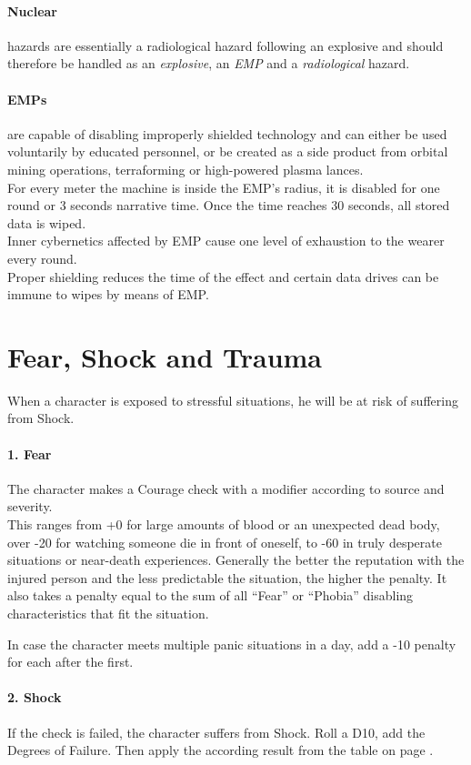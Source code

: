 \documentclass[11pt,a4paper,openany,dvipsnames]{book}
\begin{document}
	\paragraph{Nuclear} hazards are essentially a radiological hazard following an explosive and should therefore be handled as an \emph{explosive}, an \emph{EMP} and a \emph{radiological} hazard.
	\paragraph{EMPs} are capable of disabling improperly shielded technology and can either be used voluntarily by educated personnel, or be created as a side product from orbital mining operations, terraforming or high-powered plasma lances.\\
	For every meter the machine is inside the EMP’s radius, it is disabled for one round or 3 seconds narrative time. Once the time reaches 30 seconds, all stored data is wiped.\\
	Inner cybernetics affected by EMP cause one level of exhaustion to the wearer every round.\\
	Proper shielding reduces the time of the effect and certain data drives can be immune to wipes by means of EMP.
%
	\section{Fear, Shock and Trauma}
	\label{sec:fear}
	When a character is exposed to stressful situations, he will be at risk of suffering from Shock.
	\\%
	\paragraph{1. Fear}
	The character makes a Courage check with a modifier according to source and severity.\\
	This ranges from +0 for large amounts of blood or an unexpected dead body, over -20 for watching someone die in front of oneself, to -60 in truly desperate situations or near-death experiences.
	Generally the better the reputation with the injured person and the less predictable the situation, the higher the penalty. It also takes a penalty equal to the sum of all “Fear” or “Phobia” disabling characteristics that fit the situation.
	\par \vspace{-5mm}
	In case the character meets multiple panic situations in a day, add a -10 penalty for each after the first.
	\paragraph{2. Shock}
	If the check is failed, the character suffers from Shock.
	Roll a D10, add the Degrees of Failure.
	Then apply the according result from the table on page \pageref{feartable}.
\end{document}
